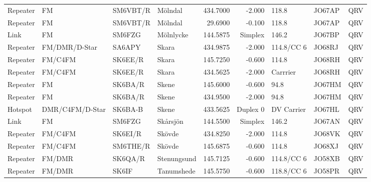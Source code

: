 {\begin{landscape}
\begin{longtable}{llllrrlll}
	Repeater          & FM              & SM6VBT/R & Mölndal               &     434.7000 &     -2.000 & 118.8             & JO67AP      & QRV      \\
	Repeater          & FM              & SM6VBT/R & Mölndal               &      29.6900 &     -0.100 & 118.8             & JO67AP      & QRV      \\
	Link              & FM              & SM6FZG   & Mölnlycke             &     144.5875 &    Simplex & 146.2             & JO67BP      & QRV      \\
	Repeater          & FM/DMR/D-Star   & SA6APY   & Skara                 &     434.9875 &     -2.000 & 114.8/CC 6        & JO68RJ      & QRV      \\
	Repeater          & FM/C4FM         & SK6EE/R  & Skara                 &     145.7250 &     -0.600 & 114.8             & JO68RH      & QRV      \\
	Repeater          & FM/C4FM         & SK6EE/R  & Skara                 &     434.5625 &     -2.000 & Carrrier          & JO68RH      & QRV      \\
	Repeater          & FM              & SK6BA/R  & Skene                 &     145.6000 &     -0.600 & 94.8              & JO67HM      & QRV      \\
	Repeater          & FM              & SK6BA/R  & Skene                 &     434.9500 &     -2.000 & 94.8              & JO67HM      & QRV      \\
	Hotspot           & DMR/C4FM/D-Star & SK6BA-B  & Skene                 &     433.5625 &   Duplex 0 & DV Carrier        & JO67HL      & QRV      \\
	Link              & FM              & SM6FZG   & Skårsjön              &     144.5500 &    Simplex & 146.2             & JO67AN      & QRV      \\
	Repeater          & FM/C4FM         & SK6EI/R  & Skövde                &     434.8250 &     -2.000 & 114.8             & JO68VK      & QRV      \\
	Repeater          & FM/C4FM         & SM6THE/R & Skövde                &     145.6875 &     -0.600 & 114.8             & JO68XJ      & QRV      \\
	Repeater          & FM/DMR          & SK6QA/R  & Stenungsund           &     145.7125 &     -0.600 & 114.8/CC 6        & JO58XB      & QRV      \\
	Repeater          & FM/DMR          & SK6IF    & Tanumshede            &     145.5750 &     -0.600 & 118.8/CC 6        & JO58PR      & QRV      \\

\end{longtable}
\end{landscape}}
